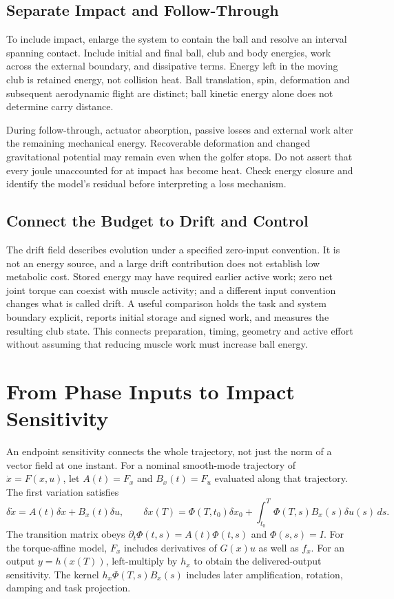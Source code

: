 \subsection*{Separate Impact and Follow-Through}

To include impact, enlarge the system to contain the ball and resolve an interval spanning contact. Include initial and final ball, club and body energies, work across the external boundary, and dissipative terms. Energy left in the moving club is retained energy, not collision heat. Ball translation, spin, deformation and subsequent aerodynamic flight are distinct; ball kinetic energy alone does not determine carry distance.

During follow-through, actuator absorption, passive losses and external work alter the remaining mechanical energy. Recoverable deformation and changed gravitational potential may remain even when the golfer stops. Do not assert that every joule unaccounted for at impact has become heat. Check energy closure and identify the model's residual before interpreting a loss mechanism.

\subsection*{Connect the Budget to Drift and Control}

The drift field describes evolution under a specified zero-input convention. It is not an energy source, and a large drift contribution does not establish low metabolic cost. Stored energy may have required earlier active work; zero net joint torque can coexist with muscle activity; and a different input convention changes what is called drift. A useful comparison holds the task and system boundary explicit, reports initial storage and signed work, and measures the resulting club state. This connects preparation, timing, geometry and active effort without assuming that reducing muscle work must increase ball energy.



\section{From Phase Inputs to Impact Sensitivity}

An endpoint sensitivity connects the whole trajectory, not just the norm of a vector field at one instant. For a nominal smooth-mode trajectory of $\dot x=F(x,u)$, let $A(t)=F_x$ and $B_x(t)=F_u$ evaluated along that trajectory. The first variation satisfies
\begin{equation}
\delta\dot x=A(t)\delta x+B_x(t)\delta u,\qquad
\delta x(T)=\Phi(T,t_0)\delta x_0+
\int_{t_0}^{T}\Phi(T,s)B_x(s)\delta u(s)\,ds.
\label{eq:complete_variation}
\end{equation}
The transition matrix obeys $\partial_t\Phi(t,s)=A(t)\Phi(t,s)$ and $\Phi(s,s)=I$. For the torque-affine model, $F_x$ includes derivatives of $G(x)u$ as well as $f_x$. For an output $y=h(x(T))$, left-multiply by $h_x$ to obtain the delivered-output sensitivity. The kernel $h_x\Phi(T,s)B_x(s)$ includes later amplification, rotation, damping and task projection.

